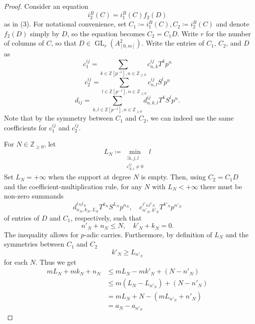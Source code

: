 \documentclass[10pt,twoside]{article}
\numberwithin{equation}{section}
\theoremstyle{plain}
\theoremstyle{definition}
\DeclareMathOperator{\GL}{GL}
\newcommand{\ZZ}{\mathbb{Z}}
\newcommand{\ZZip}{\ZZ[p^{-1}]}
\newcommand{\ZZgez}{\ZZ_{\geq 0}}
\begin{document}
\begin{proof}
        Consider an equation
        \[i_2^B(C)=i^B_1(C)f_2(D)\]
        as in  (3). For notational convenience, set \(C_1\coloneqq i_1^B(C), C_2\coloneqq i_2^B(C)\) and denote \(f_2(D)\) simply by \(D\), so the equation becomes \(C_2=C_1D.\) Write \(r\) for the number of columns of \(C\), so that \(D\in\GL_r(A^2_{[0,m]})\).
        Write the entries of \(C_1\), \(C_2\), and \(D\) as
        \[c^{ij}_1=\sum_{k\in \ZZip, n\in \ZZgez} c^{ij}_{n,k} T^k p^n\]
        \[c^{ij}_2=\sum_{l\in \ZZip, n\in \ZZgez} c^{ij}_{n,l} S^l p^n\]
        \[d_{ij}=\sum_{k,l\in \ZZip, n\in \ZZgez} d^{ij}_{n,k,l} T^k S^l p^n.\]
        Note that by the symmetry between \(C_1\) and \(C_2\), we can indeed use the same coefficients for \(c^{ij}_1\) and \(c^{ij}_2\).\par
        For \(N\in \ZZgez\), let
        \[L_N\coloneqq \min_{\substack {\exists i,j,l\\c^{ij}_{N,l}\neq 0}}\;l\]
        Set \(L_N=+\infty\) when the support at degree \(N\) is empty. Then, using \(C_2=C_1D\) and the coefficient-multiplication rule, for any \(N\) with \(L_N<+\infty\) there must be non-zero summands
        \[d^{i_Nj_N}_{n_N,k_N,L_N}T^{k_N}S^{L_N}p^{n_N}, \quad 
        c^{i'_Nj'_N}_{n'_N,k'_N} T^{k'_N} p^{n'_N}\]
        of entries of \(D\) and \(C_1\), respectively, such that
        \[ n'_N+n_N\leq N,\quad k'_N+k_N=0.\]
        The inequality allows for \(p\)-adic carries.
        Furthermore, by definition of \(L_N\) and the symmetries between \(C_1\) and \(C_2\)
        \[k'_N\geq L_{n'_N}\]
        for each \(N\). Thus we get
        \begin{align*}
            mL_N+mk_N+n_N
            &\leq mL_N-mk'_N+(N-n'_N)\\
            &\leq m(L_N-L_{n'_N})+(N-n'_N)\\
            &=mL_N+N - (mL_{n'_N}+n'_N)\\ 
            &=a_N-a_{n'_N}
        \end{align*}

\end{proof}
\end{document}
